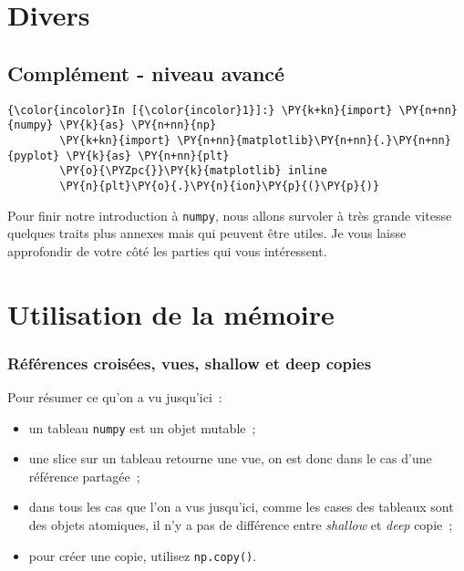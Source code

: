     
    
    
    

    

    \hypertarget{divers}{%
\section{Divers}\label{divers}}

    \hypertarget{compluxe9ment---niveau-avancuxe9}{%
\subsection{Complément - niveau
avancé}\label{compluxe9ment---niveau-avancuxe9}}

    \begin{Verbatim}[commandchars=\\\{\},frame=single,framerule=0.3mm,rulecolor=\color{cellframecolor}]
{\color{incolor}In [{\color{incolor}1}]:} \PY{k+kn}{import} \PY{n+nn}{numpy} \PY{k}{as} \PY{n+nn}{np}
        \PY{k+kn}{import} \PY{n+nn}{matplotlib}\PY{n+nn}{.}\PY{n+nn}{pyplot} \PY{k}{as} \PY{n+nn}{plt}
        \PY{o}{\PYZpc{}}\PY{k}{matplotlib} inline
        \PY{n}{plt}\PY{o}{.}\PY{n}{ion}\PY{p}{(}\PY{p}{)}
\end{Verbatim}


    Pour finir notre introduction à \texttt{numpy}, nous allons survoler à
très grande vitesse quelques traits plus annexes mais qui peuvent être
utiles. Je vous laisse approfondir de votre côté les parties qui vous
intéressent.

    \hypertarget{utilisation-de-la-muxe9moire}{%
\section{Utilisation de la mémoire}\label{utilisation-de-la-muxe9moire}}

    \hypertarget{ruxe9fuxe9rences-croisuxe9es-vues-shallow-et-deep-copies}{%
\subsubsection{Références croisées, vues, shallow et deep
copies}\label{ruxe9fuxe9rences-croisuxe9es-vues-shallow-et-deep-copies}}

    Pour résumer ce qu'on a vu jusqu'ici~:

\begin{itemize}
\tightlist
\item
  un tableau \texttt{numpy} est un objet mutable~;
\item
  une slice sur un tableau retourne une vue, on est donc dans le cas
  d'une référence partagée~;
\item
  dans tous les cas que l'on a vus jusqu'ici, comme les cases des
  tableaux sont des objets atomiques, il n'y a pas de différence entre
  \emph{shallow} et \emph{deep} copie~;
\item
  pour créer une copie, utilisez \texttt{np.copy()}.
\end{itemize}

